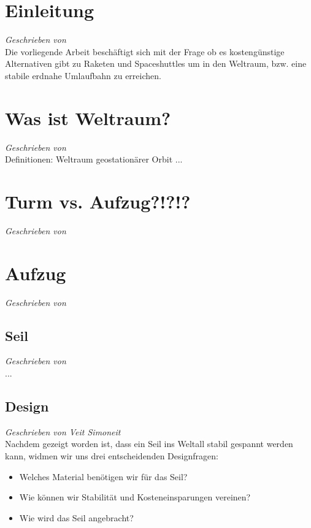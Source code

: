 \documentclass[a4paper, 10pt]{report}
\begin{document}
\chapter{Einleitung}
\textsl{Geschrieben von }\\

Die vorliegende Arbeit beschäftigt sich mit der Frage ob es kostengünstige Alternativen gibt zu Raketen und Spaceshuttles um in den Weltraum, bzw. eine stabile erdnahe Umlaufbahn zu erreichen.\\
\chapter{Was ist Weltraum?}
\textsl{Geschrieben von }\\
Definitionen:
Weltraum
geostationärer Orbit
...

\chapter{Turm vs. Aufzug?!?!?}
\textsl{Geschrieben von }\\

\chapter{Aufzug}
\textsl{Geschrieben von }\\
\section{Seil}
\textsl{Geschrieben von }\\
...
\section{Design}
\textsl{Geschrieben von Veit Simoneit}\\
Nachdem gezeigt worden ist, dass ein Seil ins Weltall stabil gespannt werden kann, widmen wir uns drei entscheidenden Designfragen: 
\begin{itemize}
\item Welches Material benötigen wir für das Seil?
\item Wie können wir Stabilität und Kosteneinsparungen vereinen?
\item Wie wird das Seil angebracht?
\end{itemize}
\end{document}
